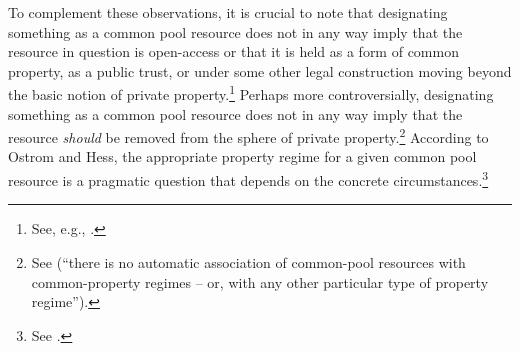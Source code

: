 To complement these observations, it is crucial to note that designating something as a common pool resource does not in any way imply that the resource in question is open-access or that it is held as a form of common property, as a public trust, or under some other legal construction moving beyond the basic notion of private property.\footnote{See, e.g., \cite[58]{ostrom10b}.} Perhaps more controversially, designating something as a common pool resource does not in any way imply that the resource {\it should} be removed from the sphere of private property.\footnote{See \cite[58]{ostrom10b} (``there is no automatic association of common-pool resources with common-property regimes -- or, with any other particular type of property regime'').} According to Ostrom and Hess, the appropriate property regime for a given common pool resource is a pragmatic question that depends on the concrete circumstances.\footnote{See \cite[58]{ostrom10b}.}
